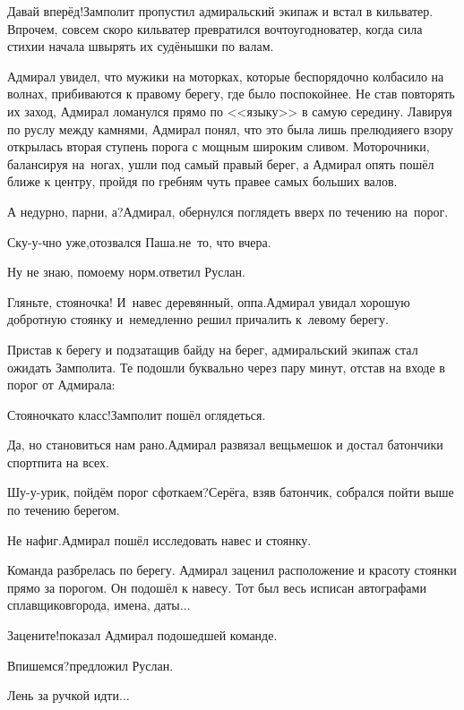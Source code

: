 \diagdash Давай вперёд!\mdash Замполит пропустил адмиральский экипаж и встал в кильватер. Впрочем, совсем скоро кильватер превратился во\sdash что\sdash угодно\sdash ватер, когда сила стихии начала швырять их судёнышки по валам.

Адмирал увидел, что мужики на моторках, которые беспорядочно колбасило на волнах, прибиваются к правому берегу, где было поспокойнее. Не став повторять их заход, Адмирал ломанулся прямо по <<языку>> в самую середину. Лавируя по руслу между камнями, Адмирал понял, что это была лишь прелюдия\mdash его взору открылась вторая ступень порога с мощным широким сливом. Моторочники, балансируя на~ногах, ушли под самый правый берег, а Адмирал опять пошёл ближе к центру, пройдя по гребням чуть правее самых больших валов. 

\diagdash А недурно, парни, а?\mdash Адмирал, обернулся поглядеть вверх по течению на~порог.

\diagdash Ску-у-чно уже,\mdash отозвался Паша.\mdash не~то, что вчера.

\diagdash Ну не знаю, по\sdash моему норм.\mdash ответил Руслан.

\diagdash Гляньте, стояночка! И~навес деревянный, оп\sdash па.\mdash Адмирал увидал хорошую добротную стоянку и~немедленно решил причалить к~левому берегу.

Пристав к берегу и подзатащив байду на берег, адмиральский экипаж стал ожидать Замполита. Те подошли буквально через пару минут, отстав на входе в порог от Адмирала:

\diagdash Стояночка\sdash то класс!\mdash Замполит пошёл оглядеться.

\diagdash Да, но становиться нам рано.\mdash Адмирал развязал вещьмешок и достал батончики спортпита на всех.

\diagdash Шу-у-урик, пойдём порог сфоткаем?\mdash Серёга, взяв батончик, собрался пойти выше по течению берегом.

\diagdash Не нафиг.\mdash Адмирал пошёл исследовать навес и стоянку. 

Команда разбрелась по берегу. Адмирал заценил расположение и красоту стоянки прямо за порогом. Он подошёл к навесу. Тот был весь исписан автографами сплавщиков\mdash города, имена, даты$\ldots$

\diagdash Зацените!\mdash показал Адмирал подошедшей команде.

\diagdash Впишемся?\mdash предложил Руслан.

\diagdash Лень за ручкой идти$\ldots$

